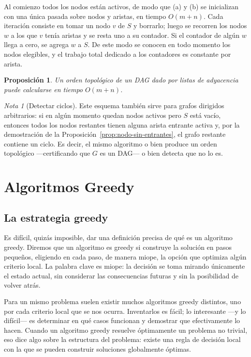 \documentclass[12pt, spanish, oneside, openany]{book}
\theoremstyle{uprightplain}
\newtheorem{proposicion}[teorema]{Proposición}
\theoremstyle{definition}
\theoremstyle{remark}
\newtheorem{nota}[teorema]{Nota}
\theoremstyle{definition}
\begin{document}
Al comienzo todos los nodos están activos, de modo que (a) y (b) se inicializan con una única pasada sobre nodos y aristas, en tiempo $O(m+n)$. Cada iteración consiste en tomar un nodo $v$ de $S$ y borrarlo; luego se recorren los nodos $w$ a los que $v$ tenía aristas y se resta uno a su contador. Si el contador de algún $w$ llega a cero, se agrega $w$ a $S$. De este modo se conocen en todo momento los nodos elegibles, y el trabajo total dedicado a los contadores es constante por arista.

\begin{proposicion}
\label{prop:topologico-tiempo}
Un orden topológico de un DAG dado por listas de adyacencia puede calcularse en tiempo $O(m+n)$.
\end{proposicion}

\begin{nota}[Detectar ciclos]
Este esquema también sirve para grafos dirigidos arbitrarios: si en algún momento quedan nodos activos pero $S$ está vacío, entonces todos los nodos restantes tienen alguna arista entrante activa y, por la demostración de la Proposición~\ref{prop:nodo-sin-entrantes}, el grafo restante contiene un ciclo. Es decir, el mismo algoritmo o bien produce un orden topológico ---certificando que $G$ es un DAG--- o bien detecta que no lo es.
\end{nota}


\chapter{Algoritmos Greedy}
\label{chap:greedy}

\section{La estrategia greedy}
\label{sec:greedy-intro}

Es difícil, quizás imposible, dar una definición precisa de qué es un algoritmo greedy. Diremos que un algoritmo es greedy si construye la solución en pasos pequeños, eligiendo en cada paso, de manera miope, la opción que optimiza algún criterio local. La palabra clave es miope: la decisión se toma mirando únicamente el estado actual, sin considerar las consecuencias futuras y sin la posibilidad de volver atrás.

Para un mismo problema suelen existir muchos algoritmos greedy distintos, uno por cada criterio local que se nos ocurra. Inventarlos es fácil; lo interesante ---y lo difícil--- es determinar en qué casos funcionan y demostrar que efectivamente lo hacen. Cuando un algoritmo greedy resuelve óptimamente un problema no trivial, eso dice algo sobre la estructura del problema: existe una regla de decisión local con la que se pueden construir soluciones globalmente óptimas.
\end{document}
